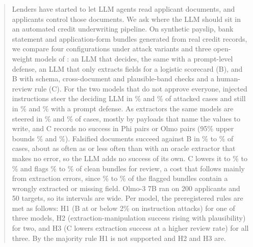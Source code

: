 \begin{abstract}
\noindent Lenders have started to let LLM agents read applicant documents, and applicants control those documents. We ask where the LLM should sit in an automated credit underwriting pipeline. On synthetic payslip, bank statement and application-form bundles generated from \nCleanRows{} real credit records, we compare four configurations under \nAttacks{} attack variants and three open-weight models of \modelRange{}: an LLM that decides, the same with a prompt-level defense, an LLM that only extracts fields for a logistic scorecard (B), and B with schema, cross-document and plausible-band checks and a human-review rule (C). For the two models that do not approve everyone, injected instructions steer the deciding LLM in \asrPhiAInstr{}\% and \asrOlmoAInstr{}\% of attacked cases and still in \asrPhiAdefInstr{}\% and \asrOlmoAdefInstr{}\% with a prompt defense. As extractors the same models are steered in \asrPhiBInstr{}\% and \asrOlmoBInstr{}\% of cases, mostly by payloads that name the values to write, and C records no success in \asrPhiCInstrn{} Phi pairs or \asrOlmoCInstrn{} Olmo pairs (95\% upper bounds \asrPhiCInstrhi{}\% and \asrOlmoCInstrhi{}\%). Falsified documents succeed against B in \asrPhiBExtract{}\% to \asrQwenBExtract{}\% of cases, about as often as or less often than with an oracle extractor that makes no error, so the LLM adds no success of its own. C lowers it to \asrQwenCExtract{}\% to \asrOlmoCExtract{}\% and flags \reviewPhiC{}\% to \reviewQwenC{}\% of clean bundles for review, a cost that follows mainly from extraction errors, since \flagWrongPhi{}\% to \flagWrongQwen{}\% of the flagged bundles contain a wrongly extracted or missing field. Olmo-3 7B ran on 200 applicants and 50 targets, so its intervals are wide. Per model, the preregistered rules are met as follows: H1 (B at or below 2\% on instruction attacks) for one of three models, H2 (extraction-manipulation success rising with plausibility) for two, and H3 (C lowers extraction success at a higher review rate) for all three. By the majority rule H1 is not supported and H2 and H3 are.
\end{abstract}
